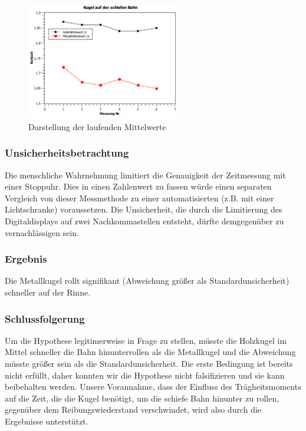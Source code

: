 \documentclass[
	a4paper,
	12pt,
	pagesize,
	ngerman
]{scrartcl}
\begin{document}
	\begin{figure}[htb]
	  \centering
	    \includegraphics[width=0.6\textwidth]{Kugel_auf_schiefer_Bahn} %
	  \caption{Darstellung der laufenden Mittelwerte}
	\end{figure}
	\subsubsection{Unsicherheitsbetrachtung}
	Die menschliche Wahrnehmung limitiert die Genauigkeit der Zeitmessung mit einer Stoppuhr. Dies in einen Zahlenwert zu fassen würde einen separaten Vergleich von dieser Messmethode zu einer automatisierten (z.B. mit einer Lichtschranke) voraussetzen. Die Unsicherheit, die durch die Limitierung des Digitaldisplays auf zwei Nachkommastellen entsteht, dürfte demgegenüber zu vernachlässigen sein.
	\subsubsection{Ergebnis}
	Die Metallkugel rollt signifikant (Abweichung größer als Standardunsicherheit) schneller auf der Rinne.
	\subsubsection{Schlussfolgerung}
	Um die Hypothese legitimerweise in Frage zu stellen, müsste die Holzkugel im Mittel schneller die Bahn hinunterrollen als die Metallkugel und die Abweichung müsste größer sein als die Standardunsicherheit. Die erste Bedingung ist bereits nicht erfüllt, daher konnten wir die Hypothese nicht falsifizieren und sie kann beibehalten werden. Unsere Vorannahme, dass der Einfluss des Trägheitsmoments auf die Zeit, die die Kugel benötigt, um die schiefe Bahn hinunter zu rollen, gegenüber dem Reibungswiederstand verschwindet, wird also durch die Ergebnisse unterstützt.
	
	
\end{document}
